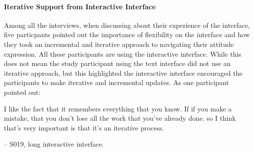 \paragraph{Iterative Support from Interactive Interface}
Among all the interviews, when discussing about their experience of the interface, five particpants pointed out the importance of flexibility on the interface and how they took an incremental and iterative approach to navigating their attitude expression. All these participants are using the interactive interface. While this does not mean the study participant using the text interface did not use an iterative approach, but this highlighted the interactive interface encouraged the participants to make iterative and incremental updates. As one participant pointed out:

\begin{displayquote}
I like the fact that it remembers everything that you know. If if you make a mistake, that you don't lose all the work that you've already done. so I think that's very important is that it's an iterative process.

\noindent \hfill -- S019, long interactive interface.
\end{displayquote}



